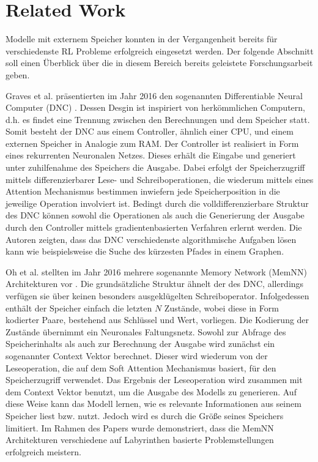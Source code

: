\chapter{Related Work}

Modelle mit externem Speicher konnten in der Vergangenheit bereits für verschiedenste \ac{RL} Probleme erfolgreich eingesetzt werden. Der folgende Abschnitt soll einen Überblick über die in diesem Bereich bereits geleistete Forschungsarbeit geben.

Graves et al. präsentierten im Jahr 2016 den sogenannten Differentiable Neural Computer (DNC) \cite{DNC}. Dessen Desgin ist inspiriert von herkömmlichen Computern, d.h. es findet eine Trennung zwischen den Berechnungen und dem Speicher statt. Somit besteht der DNC aus einem Controller, ähnlich einer CPU, und einem externen Speicher in Analogie zum RAM. Der Controller ist realisiert in Form eines rekurrenten Neuronalen Netzes. Dieses erhält die Eingabe und generiert unter zuhilfenahme des Speichers die Ausgabe. Dabei erfolgt der Speicherzugriff mittels differenzierbarer Lese- und Schreiboperationen, die wiederum mittels eines Attention Mechanismus bestimmen inwiefern jede Speicherposition in die jeweilige Operation involviert ist. Bedingt durch die volldifferenzierbare Struktur des DNC können sowohl die Operationen als auch die Generierung der Ausgabe durch den Controller mittels gradientenbasierten Verfahren erlernt werden. Die Autoren zeigten, dass das DNC verschiedenste algorithmische Aufgaben lösen kann wie beispielsweise die Suche des kürzesten Pfades in einem Graphen.

Oh et al. stellten im Jahr 2016 mehrere sogenannte Memory Network (MemNN) Architekturen vor \cite{MemNN}. Die grundsätzliche Struktur ähnelt der des DNC, allerdings verfügen sie über keinen besonders ausgeklügelten Schreiboperator. Infolgedessen enthält der Speicher einfach die letzten $N$ Zustände, wobei diese in Form kodierter Paare, bestehend aus Schlüssel und Wert, vorliegen. Die Kodierung der Zustände übernimmt ein Neuronales Faltungsnetz. Sowohl zur Abfrage des Speicherinhalts als auch zur Berechnung der Ausgabe wird zunächst ein sogenannter Context Vektor berechnet. Dieser wird wiederum von der Leseoperation, die auf dem Soft Attention Mechanismus basiert, für den Speicherzugriff verwendet. Das Ergebnis der Leseoperation wird zusammen mit dem Context Vektor benutzt, um die Ausgabe des Modells zu generieren. Auf diese Weise kann das Modell lernen, wie es relevante Informationen aus seinem Speicher liest bzw. nutzt. Jedoch wird es durch die Größe seines Speichers limitiert. Im Rahmen des Papers wurde demonstriert, dass die MemNN Architekturen verschiedene auf Labyrinthen basierte Problemstellungen erfolgreich meistern.

